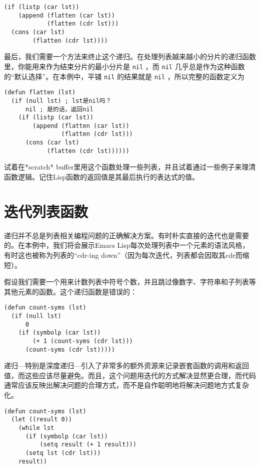 \begin{verbatim}
(if (listp (car lst))
    (append (flatten (car lst))
            (flatten (cdr lst)))
  (cons (car lst)
        (flatten (cdr lst))))
\end{verbatim}

最后，我们需要一个方法来终止这个递归。在处理列表越来越小的分片的递归函数里，你能用来作为结束分片的最小分片是 \texttt{nil} ，而 \texttt{nil} 几乎总是作为这种函数的“默认选择”。在本例中，平铺 \texttt{nil} 的结果就是 \texttt{nil} ，所以完整的函数定义为

\begin{verbatim}
(defun flatten (lst)
  (if (null lst) ; lst是nil吗？
      nil ; 是的话，返回nil
    (if (listp (car lst))
        (append (flatten (car lst))
                (flatten (cdr lst)))
      (cons (car lst)
            (flatten (cdr lst))))))
\end{verbatim}

试着在*scratch* buffer里用这个函数处理一些列表，并且试着通过一些例子来理清函数逻辑。记住Lisp函数的返回值是其最后执行的表达式的值。

\section{迭代列表函数}
\label{section:06-Iterative-List-Functions}

递归并不总是列表相关编程问题的正确解决方案。有时朴实直接的迭代也是需要的。在本例中，我们将会展示Emacs Lisp每次处理列表中一个元素的语法风格，有时这也被称为列表的“cdr-ing down”（因为每次迭代，列表都会因取其cdr而缩短）。

假设我们需要一个用来计数列表中符号个数，并且跳过像数字、字符串和子列表等其他元素的函数。这个递归函数是错误的：

\begin{verbatim}
(defun count-syms (lst)
  (if (null lst)
      0
    (if (symbolp (car lst))
        (+ 1 (count-syms (cdr lst)))
      (count-syms (cdr lst)))))
\end{verbatim}

递归---特别是深度递归---引入了非常多的额外资源来记录嵌套函数的调用和返回值，而这些应该尽量避免。而且，这个问题用迭代的方式解决显然更合理，而代码通常应该反映出解决问题的合理方式，而不是自作聪明地将解决问题地方式复杂化。

\begin{verbatim}
(defun count-syms (lst)
  (let ((result 0))
    (while lst
      (if (symbolp (car lst))
          (setq result (+ 1 result)))
      (setq lst (cdr lst)))
    result))
\end{verbatim}


